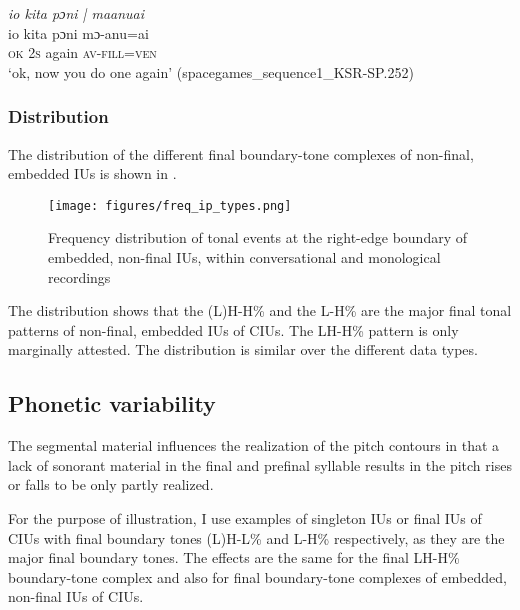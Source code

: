 \ea
\label{ex:io kita poni maanu ai}
\textit{io kita pɔni | maanuai} \\
\gll io kita pɔni mɔ-anu=ai  \\
\textsc{ok} 2\textsc{s} again \textsc{av}-\textsc{fill}\textsc{=ven}\\ 
\glt ‘ok, now you do one again’ \hfill(spacegames\_sequence1\_KSR-SP.252)
\z



\subsubsection{Distribution}

The distribution of the different final boundary-tone complexes of non-final, embedded IUs is shown in  .



\begin{figure}
	\texttt{[image: figures/freq\_ip\_types.png]}
	\caption{Frequency distribution of tonal events at the right-edge boundary of embedded, non-final IUs, within conversational and monological recordings}
	\label{Freq_ip_type}
\end{figure}



The distribution shows that the (L)H-H\% and the L-H\% are the major final tonal patterns of non-final, embedded IUs of CIUs. The LH-H\% pattern is only marginally attested. The distribution is similar over the different data types. 



\subsection{Phonetic variability}
\label{sec:phonetic-variability}



The segmental material  influences the realization of the pitch contours in that a lack of sonorant material in the final and prefinal syllable results in the pitch rises or falls to be only partly realized.



For the purpose of illustration, I use examples of singleton IUs or final IUs of CIUs with final boundary tones (L)H-L\% and L-H\%   respectively, as they are the major final boundary tones. The effects are the same for the final LH-H\% boundary-tone complex and also for final boundary-tone complexes of embedded, non-final  IUs of CIUs.



